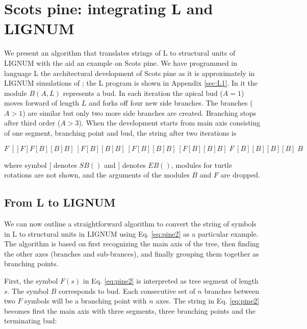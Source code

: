 \section{Scots pine: integrating L and LIGNUM}\label{sec:pine}
We present  an algorithm  that translates strings  of L  to structural
units  of LIGNUM  with  the aid  an  example on  Scots  pine. We  have
programmed in  language L the architectural development  of Scots pine
as it  is approximately in LIGNUM  simulations of \citet{perttunen:96,
perttunen:98}; the L program is shown in Appendix \ref{sec:L1}.  In it
the module $B(A,L)$ represents a bud. In each iteration the apical bud
($A =  1$) moves  forward of length  $L$ and  forks off four  new side
branches.  The branches ($A > 1  $) are similar but only two more side
branches  are  created.   Branching  stops  after third  order  ($A  >
3$).  When the  development starts  from main  axis consisting  of one
segment, branching point and bud, the string after two iterations is

\begin{equation}\label{eq:pine2}
F\;[] F [F[B][B]B]\:[F[B][B]B]\:[F[B][B]B]\:[F[B][B]B]\; F \;[B][B][B][B]\; B
\end{equation}

where symbol [ denotes $SB()$ and ] denotes $EB()$, modules for turtle
rotations are not shown, and the  arguments of the modules $B$ and $F$
are dropped.

\subsection{From L to LIGNUM}\label{sec:LtoLignum}

We can now  outline a straightforward algorithm to  convert the string
of symbols in L to structural units in LIGNUM using Eq. \ref{eq:pine2}
as a particular example.  The  algorithm is based on first recognizing
the main axis  of the tree, then finding the  other axes (branches and
sub-brances), and finally grouping them together as branching points.

First, the symbol $F(s)$ in Eq.  \ref{eq:pine2} is interpreted as tree
segment  of length  $s$.  The  symbol  $B$ corresponds  to bud.   Each
consecutive  set of $n$  branches between  two $F$  symbols will  be a
branching  point with  $n$ axes.   The string  in  Eq.  \ref{eq:pine2}
becomes  first the  main  axis with  three  segments, three  branching
points and the terminating bud:

\begin{equation}
[TS, BP, TS, BP, TS, BP, B]
\end{equation}

